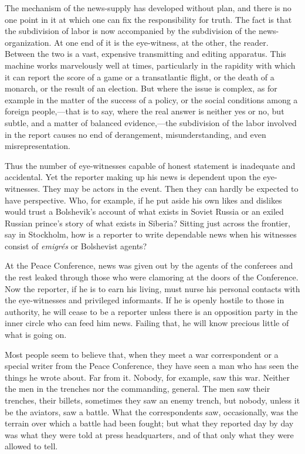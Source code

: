 \documentclass[openany,nobib,twoside,nohyper]{tufte-book}
\begin{document}
The mechanism of the news-supply has developed without plan, and there
is no one point in it at which one can fix the responsibility for truth.
The fact is that the subdivision of labor is now accompanied by the
subdivision of the news-organization. At one end of it is the
eye-witness, at the other, the reader. Between the two is a vast,
expensive transmitting and editing apparatus. This machine works
marvelously well at times, particularly in the rapidity with which it
can report the score of a game or a transatlantic flight, or the death
of a monarch, or the result of an election. But where the issue is
complex, as for example in the matter of the success of a policy, or the
social conditions among a foreign people,---that is to say, where the
real answer is neither yes or no, but subtle, and a matter of balanced
evidence,---the subdivision of the labor involved in the report causes
no end of derangement, misunderstanding, and even misrepresentation.

Thus the number of eye-witnesses capable of honest statement is
inadequate and accidental. Yet the reporter making up his news is
dependent upon the eye-witnesses. They may be actors in the event. Then
they can hardly be expected to have perspective. Who, for example, if he
put aside his own likes and dislikes would trust a Bolshevik's account
of what exists in Soviet Russia or an exiled Russian prince's story of
what exists in Siberia? Sitting just across the frontier, say in
Stockholm, how is a reporter to write dependable news when his witnesses
consist of \emph{emigrés} or Bolshevist agents?

At the Peace Conference, news was given out by the agents of the
conferees and the rest leaked through those who were clamoring at the
doors of the Conference. Now the reporter, if he is to earn his living,
must nurse his personal contacts with the eye-witnesses and privileged
informants. If he is openly hostile to those in authority, he will cease
to be a reporter unless there is an opposition party in the inner circle
who can feed him news. Failing that, he will know precious little of
what is going on.

Most people seem to believe that, when they meet a war correspondent or
a special writer from the Peace Conference, they have seen a man who has
seen the things he wrote about. Far from it. Nobody, for example, saw
this war. Neither the men in the trenches nor the commanding, general.
The men saw their trenches, their billets, sometimes they saw an enemy
trench, but nobody, unless it be the aviators, saw a battle. What the
correspondents saw, occasionally, was the terrain over which a battle
had been fought; but what they reported day by day was what they were
told at press headquarters, and of that only what they were allowed to
tell.
\end{document}
